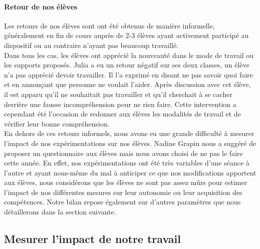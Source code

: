 \paragraph*{Retour de nos élèves}
Les retours de nos élèves sont ont été obtenus de manière informelle, généralement en fin de cours auprès de 2-3 élèves ayant activement participé au dispositif ou au contraire n'ayant pas beaucoup travaillé.  \\
Dans tous les cas, les élèves ont apprécié la nouveauté dans le mode de travail ou les supports proposés. Julia a eu un retour négatif sur ses deux classes, un élève n'a pas apprécié devoir travailler. Il l'a exprimé en disant ne pas savoir quoi faire et en annonçant que personne ne voulait l'aider. Après discussion avec cet élève, il est apparu qu'il ne souhaitait pas travailler et qu'il cherchait à se cacher derrière une fausse incompréhension pour ne rien faire. Cette intervention a cependant été l'occasion de redonner aux élèves les modalités de travail et de vérifier leur bonne compréhension.\\
En dehors de ces retours informels, nous avons eu une grande difficulté à mesurer l'impact de nos expérimentations sur nos élèves. Nadine Grapin nous a suggéré de proposer un questionnaire aux élèves mais nous avons choisi de ne pas le faire cette année. En effet, nos expérimentations ont été très variables d'une séance à l'autre et ayant nous-même du mal à anticiper ce que nos modifications apportent aux élèves, nous considérons que les élèves ne sont pas assez mûrs pour estimer l'impact de nos différentes mesures sur leur autonomie ou leur acquisition des compétences. Notre bilan repose également sur d'autres paramètres que nous détaillerons dans la section suivante.
\subsection{Mesurer l’impact de notre travail}
